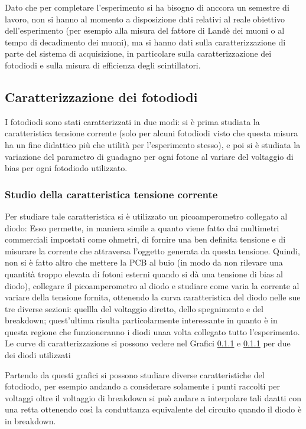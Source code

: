 Dato che per completare l'esperimento si ha bisogno di anccora un semestre di lavoro, non si hanno al momento a disposizione dati relativi al reale obiettivo dell'esperimento
(per esempio alla misura del fattore di Landè dei muoni o al tempo di decadimento dei muoni), ma si hanno dati sulla caratterizzazione di parte del sistema di acquisizione,
in particolare sulla caratterizzazione dei fotodiodi e sulla misura di efficienza degli scintillatori.
\subsection{Caratterizzazione dei fotodiodi}
I fotodiodi sono stati caratterizzati in due modi: si è prima studiata la caratteristica tensione corrente (solo per alcuni fotodiodi visto che questa misura ha un fine
didattico più che utilità per l'esperimento stesso), e poi si è studiata la variazione del parametro di guadagno per ogni fotone al variare del voltaggio di bias per ogni
fotodiodo utilizzato.

\subsubsection{Studio della caratteristica tensione corrente}
Per studiare tale caratteristica si è utilizzato un picoamperometro collegato al diodo: Esso permette, in maniera simile a quanto viene fatto dai multimetri commerciali
impostati come ohmetri, di fornire una ben definita tensione e di misurare la corrente che attraversa l'oggetto generata da questa tensione. Quindi,
non si è fatto altro che mettere la PCB al buio (in modo da non rilevare una quantità troppo elevata di fotoni esterni quando si dà una tensione di bias al diodo),
collegare il picoamperometro al diodo e studiare come varia la corrente al variare della tensione fornita, ottenendo la curva caratteristica del diodo nelle sue tre diverse
sezioni: quellla del voltaggio diretto, dello spegnimento e del breakdown; quest'ultima risulta particolarmente interessante in quanto è in questa regione che funzioneranno
i diodi unaa volta collegato tutto l'esperimento. Le curve di caratterizzazione si possono vedere nel Grafici \ref{} e \ref{} per due dei diodi utilizzati

Partendo da questi grafici si possono studiare diverse caratteristiche del fotodiodo, per esempio andando a considerare solamente i punti raccolti per voltaggi oltre
il voltaggio di breakdown si può andare a interpolare tali daatti con una retta ottenendo così la conduttanza equivalente del circuito quando il diodo è in breakdown.


